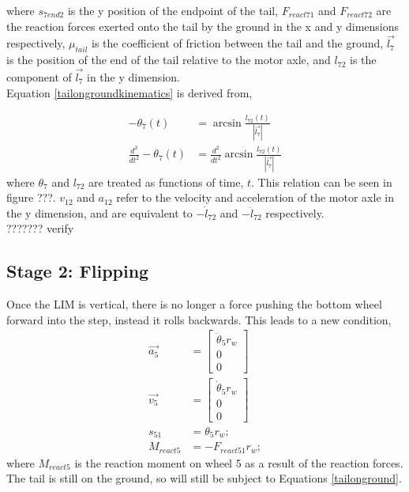 where $s_{7end2}$ is the y position of the endpoint of the tail, $F_{react71}$ and $F_{react72}$ are the reaction forces exerted onto the tail by the ground in the x and y dimensions respectively, $\mu_{tail}$ is the coefficient of friction between the tail and the ground, $\vec{l_7}$ is the position of the end of the tail relative to the motor axle, and $l_{72}$ is the component of $\vec{l_7}$ in the y dimension. \\
Equation \ref{tailongroundkinematics} is derived from,

\begin{subequations}
	\begin{align}
		-\theta_7(t) &= \arcsin{\frac{l_{72}(t)}{|\vec{l_7}|}}\\
		\frac{d^2}{dt^2}-\theta_7(t) &= \frac{d^2}{dt^2}\arcsin{\frac{l_{72}(t)}{|\vec{l_7}|}}
	\end{align}
\end{subequations}
where $\theta_7$ and $l_{72}$ are treated as functions of time, $t$. This relation can be seen in figure ???. $v_{12}$ and $a_{12}$ refer to the velocity and acceleration of the motor axle in the y dimension, and are equivalent to $-\dot{l}_{72}$ and $-\ddot{l}_{72}$ respectively.\\ ??????? verify

\subsection*{Stage 2: Flipping}

Once the LIM is vertical, there is no longer a force pushing the bottom wheel forward into the step, instead it rolls backwards. This leads to a new condition,
\begin{subequations}
	\label{wheel1rolling}
	\begin{align}
		\vec{a_5} &= \begin{bmatrix}
			\ddot{\theta}_5 r_w \\
			0\\
			0
		\end{bmatrix}\\
		\vec{v_5} &= \begin{bmatrix}
			\dot{\theta}_5 r_w \\
			0\\
			0
		\end{bmatrix}\\
		s_{51} &= \theta_{5} r_w;\\
		M_{react5} &= - F_{react51} r_w;
	\end{align}
\end{subequations}
where $M_{react5}$ is the reaction moment on wheel 5 as a result of the reaction forces.
The tail is still on the ground, so will still be subject to Equations \ref{tailonground}.


